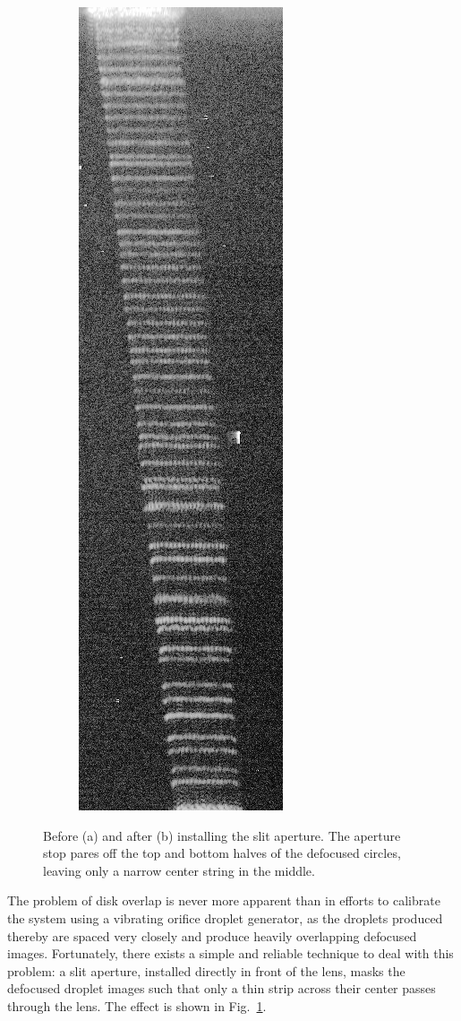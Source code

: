 \documentclass[11.5pt,oneside]{book}
\newcommand*{\figref}[1]{Fig.~\ref{#1}}
\begin{document}
\begin{figure}[h!]
    \begin{subfigure}[b]{0.4\textwidth}
        \centering
        \includegraphics[height=0.6\textheight]{img/slitted.jpg}
        \caption{}
    \end{subfigure}
    \caption{Before (a) and after (b) installing the slit aperture. The aperture
    stop pares off the top and bottom halves of the defocused circles, leaving
only a narrow center string in the middle.}
    \label{fig:globalsizing}
\end{figure}
The problem of disk overlap is never more apparent than in efforts to calibrate
the system using a vibrating orifice droplet generator, as the droplets produced
thereby are spaced very closely and produce heavily overlapping defocused
images. Fortunately, there exists a simple and reliable technique to deal with
this problem: a slit aperture, installed directly in front of the lens, masks
the defocused droplet images such that only a thin strip across their center
passes through the lens. The effect is shown in \figref{fig:globalsizing}. 
\end{document}
